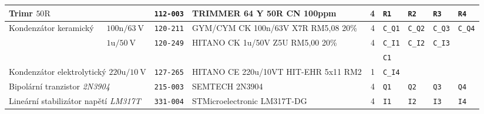 \documentclass[twoside,project,skipblank]{../MFFPrace}
\begin{document}
\begin{landscape}
\begin{table}[!h]
\begin{tabular}{|l|l||c|l|r||l|l|l|l|}
            \multicolumn{2}{|l||}{Trimr $50\text{R}$}                                    & \texttt{112-003}                               & \tiny{TRIMMER 64 Y 50R CN 100ppm}                & 4                                                        & \texttt{R1}                          & \texttt{R2}           & \texttt{R3}           & \texttt{R4}                            \\\hline
            \multirow{3}{*}{Kondenzátor keramický}                                       & $100\text{n}/63\:\text{V}$                     & \texttt{120-211}                                 & \tiny{GYM/CYM CK 100n/63V X7R RM5,08 20\%}               & 4                                    & \texttt{C\_Q1}        & \texttt{C\_Q2}        & \texttt{C\_Q3}        & \texttt{C\_Q4} \\\cline{2-9}
                                                                                         & \multirow{2}{*}{$1\text{u}/50\:\text{V}$}      & \multirow{2}{*}{\texttt{120-249}}                & \multirow{2}{*}{\tiny{HITANO CK 1u/50V Z5U RM5,00 20\%}} & \multirow{2}{*}{4}                   & \texttt{C\_I1}        & \texttt{C\_I2}        & \texttt{C\_I3}        &                \\\cline{6-9}
                                                                                         &                                                &                                                  &                                                          &                                      & \texttt{C1}           & \multicolumn{3}{l|}{}                                          \\\hline
            \multicolumn{2}{|l||}{Kondenzátor elektrolytický $220\text{u}/10\:\text{V}$} & \texttt{127-265}                               & \tiny{HITANO CE 220u/10VT HIT-EHR 5x11 RM2}      & 1                                                        & \texttt{C\_I4}                       & \multicolumn{3}{l|}{}                                                                  \\\hline
            \multicolumn{2}{|l||}{Bipolární tranzistor \textit{2N3904}}                  & \texttt{215-003}                               & \tiny{SEMTECH 2N3904}                            & 4                                                        & \texttt{Q1}                          & \texttt{Q2}           & \texttt{Q3}           & \texttt{Q4}                            \\\hline
            \multicolumn{2}{|l||}{Lineární stabilizátor napětí \textit{LM317T}}          & \texttt{331-004}                               & \tiny{STMicroelectronic LM317T-DG}               & 4                                                        & \texttt{I1}                          & \texttt{I2}           & \texttt{I3}           & \texttt{I4}                            \\\hline

\end{tabular}
\end{table}
\end{landscape}
\end{document}
